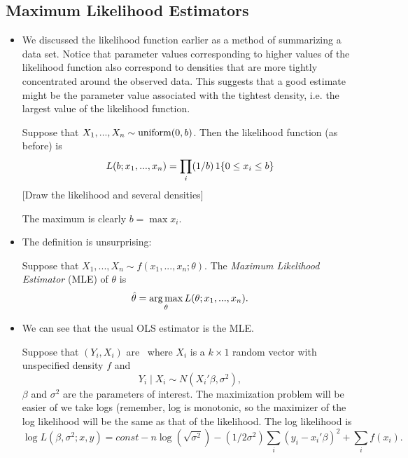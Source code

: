 \subsection{Maximum Likelihood Estimators}

\begin{itemize}[leftmargin=0pt]

\item We discussed the likelihood function earlier as a method of
  summarizing a data set.  Notice that parameter values corresponding
  to higher values of the likelihood function also correspond to
  densities that are more tightly concentrated around the observed
  data.  This suggests that a good estimate might be the parameter
  value associated with the tightest density, i.e. the largest value
  of the likelihood function.

  \begin{ex} Suppose that $X_1,...,X_n \sim \operatorname{uniform}(0, b)$.  Then the
    likelihood function (as before) is
    \begin{equation*}
      L(b; x_1,...,x_n) = \prod_i (1/b) \operatorname{1}\{0 \leq x_i \leq b\}
    \end{equation*}
    [Draw the likelihood and several densities]

    The maximum is clearly $b = \max x_i$.
  \end{ex}

\item The definition is unsurprising:
  \begin{defn}
    Suppose that $X_1,...,X_n \sim f(x_1,...,x_n; \theta)$.  The \emph{Maximum
      Likelihood Estimator} (MLE) of $\theta$ is
    \begin{equation*}
      \hat{\theta} = \operatorname*{arg\,max}_\theta L(\theta; x_1,...,x_n).
    \end{equation*}
  \end{defn}

\item We can see that the usual OLS estimator is the MLE.
  \begin{ex} Suppose that $(Y_i,X_i)$ are \iid\ where $X_i$ is a $k \times
    1$ random vector with unspecified density $f$ and
    \begin{equation*}
      Y_i \mid X_i \sim N(X_i'\beta, \sigma^2),
    \end{equation*}
    $\beta$ and $\sigma^2$ are the parameters of interest.  The maximization
    problem will be easier of we take logs (remember, log is
    monotonic, so the maximizer of the log likelihood will be the same
    as that of the likelihood.  The log likelihood is
    \begin{equation*}
      \log L(\beta,\sigma^2; x, y) = const - n\log (\sqrt{\sigma^2}) -
      (1/2\sigma^2) \sum_i (y_i - x_i'\beta)^2 + \sum_i f(x_i).
    \end{equation*}
    

\end{ex}
\end{itemize}
